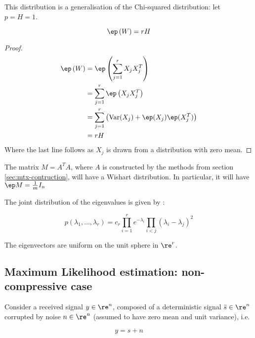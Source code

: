 \begin{remark}
This distribution is a generalisation of the Chi-squared distribution: let \(p = H = 1\). 
\end{remark}

\begin{theorem}
\begin{equation}
\ep\left(W\right) = rH
\end{equation}
\end{theorem}
\begin{proof}
\begin{align*}
\ep\left(W\right) &= \ep\left(\sum_{j=1}^r X_j X_j^T\right) \\
&= \sum_{j=1}^r \ep\left(X_jX_j^T\right) \\
&= \sum_{j=1}^r \left( \mathrm{Var}(X_j) + \ep(X_j) \ep(X_j^T)   \right) \\
&= rH 
\end{align*}
Where the last line follows as \(X_j\) is drawn from a distribution with zero mean.
\end{proof}

\begin{remark}
The matrix \(M = A^TA\), where \(A\) is constructed by the methods from section \ref{sec:mtx-contruction}, will have a Wishart distribution. In particular, it will have \(\ep M = \frac{1}{m}I_n\) 
\label{remark: exp AtA}
\end{remark}

The joint distribution of the eigenvalues is given by \cite{levequeMatrices}:

\begin{equation}
p\left(\lambda_1, \ldots, \lambda_r\right) = c_r \prod_{i=1}^r e^{-\lambda_i}\prod_{i<j}\left(\lambda_i - \lambda_j\right)^2
\end{equation}

The eigenvectors are uniform on the unit sphere in \(\re^{r}\).

\subsection{Maximum Likelihood estimation: non-compressive case}\label{sec:max-like}

Consider a received signal \(y \in \re^n\), composed of a deterministic signal \(\bar{s} \in \re^n\) corrupted by noise \(n \in \re^n\) (assumed to have zero mean and unit variance), i.e.

\begin{equation}
y = s + n
\end{equation}

